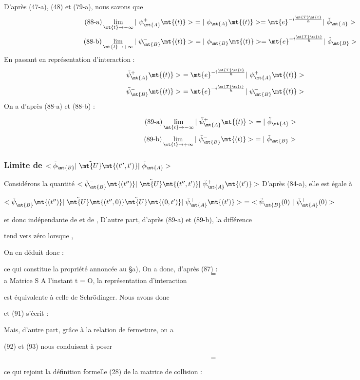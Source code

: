 D'après (47-a), (48) et (79-a), nous savons que
\[
\tag{88-a}\lim_{\mt{t}\to-\infty}|\ \psi_\mt{A}^+\mt{(t)}>\ =|\ \phi_\mt{A}\mt{(t)}>=
\mt{ e}^{-i\frac{\mt{T}\mt{t}}{\hbar}}|\ \tilde{\phi}_\mt{A}>
\]
\[
\tag{88-b}\lim_{\mt{t}\to+\infty}|\ \psi_\mt{B}^-\mt{(t)}>\ =|\ \phi_\mt{B}\mt{(t)}>=
\mt{ e}^{-i\frac{\mt{T}\mt{t}}{\hbar}}|\ \tilde{\phi}_\mt{B}>
\]
En passant en représentation d'interaction :
\[
|\ \tilde{\psi}_\mt{A}^+\mt{(t)}>\ =\mt{ e}^{-i\frac{\mt{T}\mt{t}}{\hbar}}|\ \psi_\mt{A}^+\mt{(t)}>
\]
\[
|\ \tilde{\psi}_\mt{B}^-\mt{(t)}>\ =\mt{ e}^{-i\frac{\mt{T}\mt{t}}{\hbar}}|\ \psi_\mt{B}^-\mt{(t)}>
\]
On a d'après (88-a) et (88-b) :

\[
\tag{89-a}\lim_{\mt{t}\to-\infty}|\ \tilde{\psi}_\mt{A}^+\mt{(t)}>\ =|\ \tilde{\phi}_\mt{A}>
\]
\[
\tag{89-b}\lim_{\mt{t}\to+\infty}|\ \tilde{\psi}_\mt{B}^-\mt{(t)}>\ =|\ \tilde{\phi}_\mt{B}>
\]

\subsubsection{Limite de $<\tilde{\phi}_\mt{B }|\ \tilde{\mt{U}}\mt{(t'', t') }|\ \tilde{\phi}_\mt{A}>$}%
Considérons la quantité
$<\tilde{\psi}_\mt{B}^-\mt{(t'') }|\ \tilde{\mt{U}}\mt{(t'', t') }|\ \tilde{\psi}_\mt{A}^+\mt{(t')}>$
D'après (84-a), elle est égale à
\begin{center}
$<\tilde{\psi}_\mt{B}^-\mt{(t'') }|\ \tilde{\mt{U}}\mt{(t'', 0) }\tilde{\mt{U}}\mt{(0, t') }|\ \tilde{\psi}_\mt{A}^+\mt{(t')}>\ =\ 
<\tilde{\psi}_\mt{B}^-(0)\ |\ \tilde{\psi}_\mt{A}^+(0)>$
\end{center}

et donc indépendante de  et de ,
D'autre part, d'après (89-a) et (89-b), la différence

tend vers zéro lorsque ,

On en déduit donc :

ce qui constitue la propriété annoncée au \S a),
On a donc, d'après (87) :
\[
\tag{91}=
\]
a Matrice S
A l'instant t = O, la représentation d'interaction

est équivalente à celle de Schrödinger. Nous avons donc

et (91) s'écrit :

Mais, d'autre part, grâce à la relation de fermeture, on a


(92) et (93) nous conduisent à poser

\[
\tag{94}=
\]

ce qui rejoint la définition formelle (28) de la matrice de collision :

